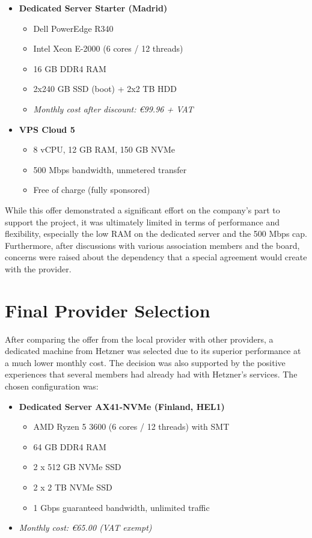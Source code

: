 \begin{itemize}
  \item \textbf{Dedicated Server Starter (Madrid)}
    \begin{itemize}
      \item Dell PowerEdge R340
      \item Intel Xeon E-2000 (6 cores / 12 threads)
      \item 16 GB DDR4 RAM
      \item 2x240 GB SSD (boot) + 2x2 TB HDD
      \item \textit{Monthly cost after discount: €99.96 + VAT}
    \end{itemize}
  \item \textbf{VPS Cloud 5}
    \begin{itemize}
      \item 8 vCPU, 12 GB RAM, 150 GB NVMe
      \item 500 Mbps bandwidth, unmetered transfer
      \item Free of charge (fully sponsored)
    \end{itemize}
\end{itemize}

While this offer demonstrated a significant effort on the company's part to support the project, it was ultimately limited in terms of performance and flexibility, especially the low RAM on the dedicated server and the 500 Mbps cap. Furthermore, after discussions with various association members and the board, concerns were raised about the dependency that a special agreement would create with the provider.

\section{Final Provider Selection}

After comparing the offer from the local provider with other providers, a dedicated machine from Hetzner was selected due to its superior performance at a much lower monthly cost. The decision was also supported by the positive experiences that several members had already had with Hetzner's services. The chosen configuration was:

\begin{itemize}
  \item \textbf{Dedicated Server AX41-NVMe (Finland, HEL1)}
  \begin{itemize}
    \item AMD Ryzen 5 3600 (6 cores / 12 threads) with SMT
    \item 64 GB DDR4 RAM
    \item 2 x 512 GB NVMe SSD
    \item 2 x 2 TB NVMe SSD
    \item 1 Gbps guaranteed bandwidth, unlimited traffic
  \end{itemize}
  \item \textit{Monthly cost: €65.00 (VAT exempt)}
\end{itemize}

